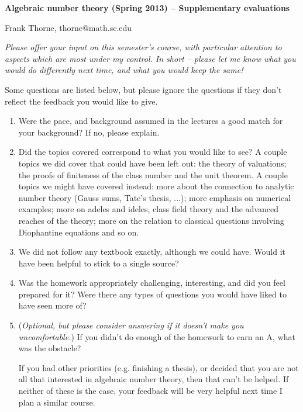 \documentclass[12pt]{article}
\begin{document}
\setlength{\topmargin}{-2mm}





\begin{center}{\bf Algebraic number theory (Spring 2013) -- Supplementary evaluations}
\end{center}
\begin{center}Frank Thorne, thorne@math.sc.edu
\end{center}

{\itshape Please offer your input on this semester's course, with particular attention to aspects which are
most under my control. In short -- please let me know what you would do differently next time, and what you would keep the same!

Some questions are listed below, but please ignore the questions if they don't reflect the feedback you would like to give.}

\begin{enumerate}
\item
Were the pace, and background assumed in the lectures a good match for your background?
If no, please explain.

\item
Did the topics covered correspond to what you would like to see? A couple topics we did cover that could have been
left out: the theory of valuations; the proofs of finiteness of the class number and the unit theorem. A couple topics we might
have covered instead: more about the connection to analytic number theory (Gauss sums, Tate's thesis, ...); more emphasis
on numerical examples; more on adeles and ideles, class field theory and the advanced reaches of the theory; more on the relation
to classical questions involving Diophantine equations and so on.

\item
We did not follow any textbook exactly, although we could have. Would it have been helpful to stick to a single source?

\item
Was the homework appropriately challenging, interesting, and did you feel prepared for it? Were there any types of questions you would
have liked to have seen more of?

\item
({\itshape Optional, but please consider answering if it doesn't make you uncomfortable.})
If you didn't do enough of the homework to earn an A, what was the obstacle?

If you had other priorities (e.g. finishing a thesis), or decided that you are not all that interested in algebraic number theory,
then that can't be helped. If neither of these is the case, your feedback will be very helpful next time I plan a similar course.
\end{enumerate}
\end{document}
